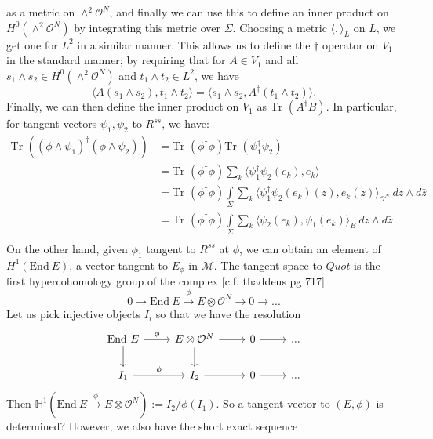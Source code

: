 \documentclass[]{article}
\newcommand{\OO}{\mathcal{O}}
\newcommand{\MM}{\mathcal{M}}
\newcommand{\End}{\text{End}~}
\newcommand{\Tr}{\text{Tr }}
\newcommand{\HH}{\mathbb{H}}
\begin{document}
	as a metric on $\wedge^2 \OO^N$, and finally we can use this to define an inner product on $H^0(\wedge^2 \OO^N)$ by integrating this metric over $\Sigma$. Choosing a metric $\langle, \rangle_L$ on $L$, we get one for $L^2$ in a similar manner. This allows us to define the $\dagger$ operator on $V_1$ in the standard manner; by requiring that for $A\in V_1$ and all $s_1 \wedge s_2 \in H^0(\wedge^2 \OO^N)$ and $t_1\wedge t_2 \in L^2$, we have
	\begin{equation}
		\langle A(s_1 \wedge s_2), t_1\wedge t_2 \rangle = \langle s_1 \wedge s_2, A^\dagger(t_1 \wedge t_2)\rangle.
	\end{equation}
	Finally, we can then define the inner product on $V_1$ as $\Tr(A^\dagger B)$. In particular, for tangent vectors $\psi_1, \psi_2$ to $R^{ss}$, we have:
	\begin{align*}
		\Tr((\phi \wedge \psi_1)^\dagger (\phi \wedge \psi_2)) &= \Tr(\phi^\dagger \phi)\Tr(\psi_1^\dagger \psi_2) \\
		&= \Tr(\phi^\dagger \phi)\sum_{k} \langle \psi_1^\dagger\psi_2(e_k), e_k\rangle\\
		&= \Tr(\phi^\dagger \phi)\int\limits_{\Sigma} \sum_k \langle \psi_1^\dagger \psi_2(e_k)(z), e_k(z)\rangle_{\OO^N}~dz\wedge d\bar{z}\\
		&= \Tr(\phi^\dagger \phi)\int\limits_{\Sigma} \sum_k \langle 
		\psi_2 (e_k), \psi_1(e_k)
		\rangle_E ~dz\wedge d\bar{z}\\
	\end{align*}
	On the other hand, given $\phi_1$ tangent to $R^{ss}$ at $\phi$, we can obtain an element of $H^1(\End E)$, a vector tangent to $E_\phi$ in $\MM$. The tangent space to $Quot$ is the first hypercohomology group of the complex [c.f. thaddeus pg 717]
	\begin{equation}
		0 \to \End E \xrightarrow{\phi} E\otimes \OO^N \to 0 \to...
	\end{equation}
	Let us pick injective objects ${I_{i}}$ so that we have the resolution
	\[\begin{tikzcd}
		{\End E} & {E\otimes \OO^N} & 0 & {...} \\
		{I_1} & {I_2} & 0 & {...}
		\arrow[from=2-2, to=2-3]
		\arrow["\phi", from=1-1, to=1-2]
		\arrow[from=1-2, to=1-3]
		\arrow["\phi", from=2-1, to=2-2]
		\arrow[from=1-1, to=2-1]
		\arrow[from=1-2, to=2-2]
		\arrow[from=1-3, to=1-4]
		\arrow[from=2-3, to=2-4]
	\end{tikzcd}\]
	Then $\HH^1(\End E\xrightarrow{\phi} E\otimes \OO^N) := I_2/\phi(I_1)$. So a tangent vector to $(E,\phi)$ is determined? However, we also have the short exact sequence
\end{document}
